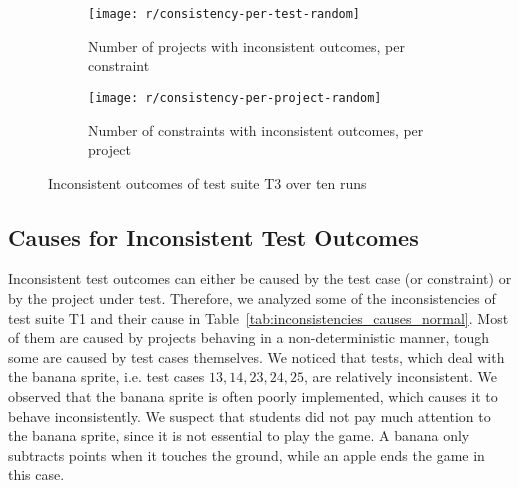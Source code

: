 \begin{figure}[htpb]
    \centering
    \begin{subfigure}{.75\textwidth}
        \texttt{[image: r/consistency-per-test-random]}%
        \vspace{-\medskipamount}
        \caption{Number of projects with inconsistent outcomes, per constraint}
        \label{fig:consistency_per_test_random}
    \end{subfigure}

    \bigskip

    \begin{subfigure}{.75\textwidth}
        \texttt{[image: r/consistency-per-project-random]}%
        \vspace{-\medskipamount}
        \caption{Number of constraints with inconsistent outcomes, per project}
        \label{fig:consistency_per_project_random}
    \end{subfigure}

    \caption{Inconsistent outcomes of test suite T3 over ten runs}
    \label{fig:consistency_random}
\end{figure}

\subsection{Causes for Inconsistent Test Outcomes}

Inconsistent test outcomes can either be caused by the test case (or constraint) or by the project under test.
Therefore, we analyzed some of the inconsistencies of test suite T1 and their cause in Table~\ref{tab:inconsistencies_causes_normal}.
Most of them are caused by projects behaving in a non-deterministic manner,
tough some are caused by test cases themselves.
We noticed that tests, which deal with the banana sprite, i.e. test cases $13, 14, 23, 24, 25$, are relatively inconsistent.
We observed that the banana sprite is often poorly implemented, which causes it to behave inconsistently.
We suspect that students did not pay much attention to the banana sprite, since it is not essential to play the game.
A banana only subtracts points when it touches the ground, while an apple ends the game in this case.
\parspace

